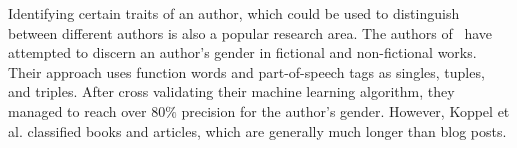 Identifying certain traits of an author, which could be used to distinguish between different authors is also a popular research area.
The authors of~\cite{koppel2003automatically} have attempted to discern an author's gender in fictional and non-fictional works.
Their approach uses function words and part-of-speech tags as singles, tuples, and triples.
After cross validating their machine learning algorithm, they managed to reach over $80\%$ precision for the author's gender.
However, Koppel et al. classified books and articles, which are generally much longer than blog posts.